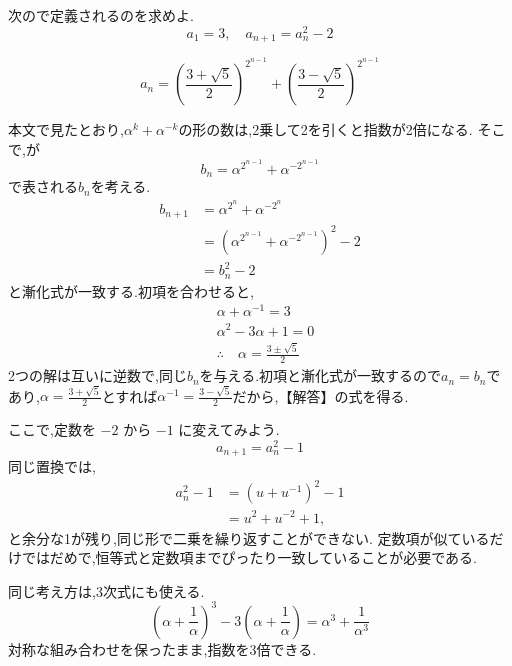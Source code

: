 \noindent {}\par\nobreak
\begin{smallquote}
  次ので定義されるのを求めよ.
  \[
    a_1=3, \quad a_{n+1}=a_n^2-2
  \]
\end{smallquote}
\noindent{}\par\nobreak
\begin{smallquote}
  \[
    a_n=\left(\frac{3+ \sqrt{5}}{2}\right)^{2^{n-1}}+\left(\frac{3- \sqrt{5}}{2}\right)^{2^{n-1}}
  \]
\end{smallquote}
\noindent{}\par\nobreak
\begin{smallquote}
  本文で見たとおり,$\alpha^k+\alpha^{-k}$の形の数は,2乗して2を引くと指数が2倍になる.
  そこで,が
  \[
    b_n=\alpha^{2^{n-1}}+\alpha^{-2^{n-1}}
  \]
  で表される$b_n$を考える.
  \begin{align*}
    b_{n+1}&=\alpha^{2^{n}}+\alpha^{-2^{n}}\\
    &=\left(\alpha^{2^{n-1}}+\alpha^{-2^{n-1}}\right)^2-2\\
    &=b_n^2-2
  \end{align*}
  と漸化式が一致する.初項を合わせると,
  \begin{align*}
    &\alpha+\alpha^{-1}=3\\
    &\alpha^2-3\alpha+1=0\\
    &\therefore \quad \alpha=\frac{3\pm \sqrt{5}}{2}
  \end{align*}
  2つの解は互いに逆数で,同じ$b_n$を与える.初項と漸化式が一致するので$a_n=b_n$であり,$\alpha=\frac{3+\sqrt5}{2}$とすれば$\alpha^{-1}=\frac{3-\sqrt5}{2}$だから,【解答】の式を得る.
\end{smallquote}

ここで,定数を $-2$ から $-1$ に変えてみよう.
\[
  a_{n+1}=a_n^2-1
\]
同じ置換では,
\begin{align*}
  a_n^2-1
  &=\left(u+u^{-1}\right)^2-1\\
  &=u^2+u^{-2}+1,
\end{align*}
と余分な1が残り,同じ形で二乗を繰り返すことができない.
定数項が似ているだけではだめで,恒等式と定数項までぴったり一致していることが必要である.

同じ考え方は,3次式にも使える.
\[
  \left(\alpha+\frac{1}{\alpha}\right)^3
  -3\left(\alpha+\frac{1}{\alpha}\right)
  =\alpha^3+\frac{1}{\alpha^3}
\]
対称な組み合わせを保ったまま,指数を3倍できる.

